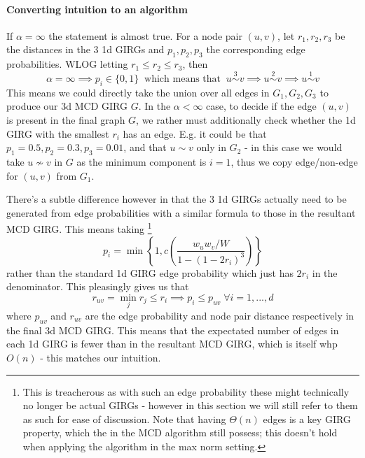 \paragraph{Converting intuition to an algorithm}
If $\alpha=\infty$ the  statement is almost true.
For a node pair $(u,v)$, let $r_1, r_2, r_3$ be the distances in the $3$ 1d GIRGs and $p_1, p_2, p_3$ the corresponding edge probabilities. WLOG letting $r_1 \leq r_2 \leq r_3$, then
\begin{equation}
    \alpha = \infty \implies p_i \in \{0, 1\} \;\; \text{which means that} \;\; u \stackrel{3}{\sim} v \implies u \stackrel{2}{\sim} v \implies u \stackrel{1}{\sim} v
\end{equation}
This means we could directly take the union over all edges in $G_1, G_2, G_3$ to produce our 3d MCD GIRG $G$.
In the $\alpha < \infty$ case, to decide if the edge $(u,v)$ is present in the final graph $G$, we rather must additionally check whether the 1d GIRG with the smallest $r_i$ has an edge. E.g. it could be that $p_1 = 0.5, p_2 = 0.3, p_3 = 0.01$, and that $u \sim v$ only in $G_2$ - in this case we would take $u \not \sim v$ in $G$ as the minimum component is $i=1$, thus we copy edge/non-edge for $(u, v)$ from $G_1$. 

There's a subtle difference however in that the $3$ 1d GIRGs actually need to be generated from edge probabilities with a similar formula to those in the resultant MCD GIRG. This means taking
\footnote{This is treacherous as with such an edge probability these  might technically no longer be actual GIRGs - however in this section we will still refer to them as such for ease of discussion. Note that having $\Theta(n)$ edges is a key GIRG property, which the  in the MCD algorithm still possess; this doesn't hold when applying the algorithm in the max norm setting.}
\begin{equation}
    p_i = \min \left \{
        1, c \left ( 
            \frac{w_u w_v / W}{1 - (1 - 2 r_i)^3}
        \right )     
    \right \}
\end{equation}
rather than the standard 1d GIRG edge probability which just has $2 r_i$ in the denominator. 
This pleasingly gives us that
\begin{equation}
    r_{uv} = \min_j r_j \leq r_i \implies p_i \leq p_{uv} \; \forall i=1,...,d
\end{equation}
where $p_{uv}$ and $r_{uv}$ are the edge probability and node pair distance respectively in the final 3d MCD GIRG. This means that the expectated number of edges in each 1d GIRG is fewer than in the resultant MCD GIRG, which is itself whp $O(n)$ - this matches our  intuition.

